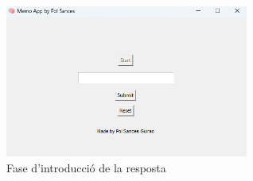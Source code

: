 \begin{figure}[h!]
    \centering
    \includegraphics[width=8cm]{img/figures/app-fase3.png}
    \caption{Fase d'introducció de la resposta}
    \label{fig:fase-resp}
\end{figure}
